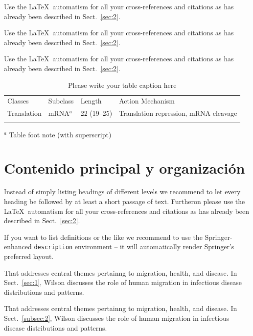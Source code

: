  Use the \LaTeX\ automatism for all your cross-references and citations as has already been described in Sect.~\ref{sec:2}.

 Use the \LaTeX\ automatism for all your cross-refer\-ences and citations as has already been described in Sect.~\ref{sec:2}.

 Use the \LaTeX\ automatism for all your cross-refer\-ences and citations as has already been described in Sect.~\ref{sec:2}.
%
%
\begin{table}[!t]
	\caption{Please write your table caption here}
	\label{tab:1}       %
	\begin{tabular}{p{2cm}p{2.4cm}p{2cm}p{4.9cm}}
		\hline\noalign{\smallskip}
		Classes     & Subclass & Length      & Action Mechanism                      \\
		\noalign{\smallskip}\svhline\noalign{\smallskip}
		Translation & mRNA$^a$ & 22 (19--25) & Translation repression, mRNA cleavage \\
		\noalign{\smallskip}\hline\noalign{\smallskip}
	\end{tabular}
	$^a$ Table foot note (with superscript)
\end{table}
%
\section{Contenido principal y organización}
\label{sec:3}
Instead of simply listing headings of different levels we recommend to let every heading be followed by at least a short passage of text. Furtheron please use the \LaTeX\ automatism for all your cross-references and citations as has already been described in Sect.~\ref{sec:2}.

If you want to list definitions or the like we recommend to use the Springer-enhanced \verb|description| environment -- it will automatically render Springer's preferred layout.

\begin{description}[Type 1]
	\item[Type 1]{That addresses central themes pertainng to migration, health, and disease. In Sect.~\ref{sec:1}, Wilson discusses the role of human migration in infectious disease distributions and patterns.}
	\item[Type 2]{That addresses central themes pertainng to migration, health, and disease. In Sect.~\ref{subsec:2}, Wilson discusses the role of human migration in infectious disease distributions and patterns.}
\end{description}

